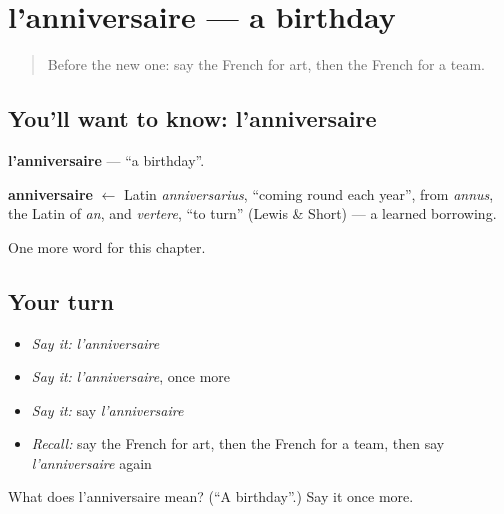\section[l'anniversaire]{l'anniversaire — a birthday}

\label{lesson:FR-C257-anniversaire}



\begin{quote}
Before the new one: say the French for art, then the French for a team.
\end{quote}

\subsection*{You'll want to know: l'anniversaire}
\textbf{l'anniversaire} — \textquotedblleft{}a birthday\textquotedblright{}.

\begin{cousinweb}
\textbf{anniversaire} $\leftarrow$ Latin \emph{anniversarius}, \textquotedblleft{}coming round each year\textquotedblright{}, from \emph{annus}, the Latin of \emph{an}, and \emph{vertere}, \textquotedblleft{}to turn\textquotedblright{} (Lewis \& Short) — a learned borrowing.
\end{cousinweb}

\begin{grammarlens}[title={What you've built}]
One more word for this chapter.
\end{grammarlens}

\subsection*{Your turn}
\begin{itemize}
\raggedright
  \item \emph{Say it:} \emph{l'anniversaire}
  \item \emph{Say it:} \emph{l'anniversaire}, once more
  \item \emph{Say it:} say \emph{l'anniversaire}
  \item \emph{Recall:} say the French for art, then the French for a team, then say \emph{l'anniversaire} again
\end{itemize}

\begin{tcolorbox}[breakable,colback=teal!4,colframe=teal!35!black,title={Before you move on}]
What does l'anniversaire mean? (\textquotedblleft{}A birthday\textquotedblright{}.) Say it once more.
\end{tcolorbox}
